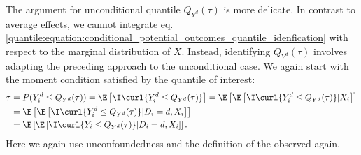  The argument for unconditional quantile $Q_{Y^d}(\tau)$ is more delicate. In contrast to average effects,  we cannot integrate eq. \eqref{quantile:equation:conditional_potential_outcomes_quantile_idenfication} with respect to the marginal distribution of $X$. 
 Instead, identifying $Q_{Y^d}(\tau)$ involves adapting the preceding approach to the unconditional case. 
We again start with the moment condition satisfied by the quantile of interest:
\begin{align}
	\tau & = P(Y^d_i\leq Q_{Y^d}(\tau) ) =  \E\left[ \I\curl{Y^d_i\leq Q_{Y^d}(\tau)  }\right] =  \E\left[ \E\left[ \I\curl{Y^d_i\leq  Q_{Y^d}(\tau)  }|X_i \right]  \right] \\
	& =   \E\left[ \E\left[\I\curl{Y^d_i\leq Q_{Y^d}(\tau)  }| D_i=d, X_i\right]\right]  \\
	& = \E\left[ \E\left[\I\curl{Y_i\leq Q_{Y^d}(\tau)  }| D_i=d, X_i\right]\right].
\end{align}
 Here we again use unconfoundedness and the definition of the observed again.
 
